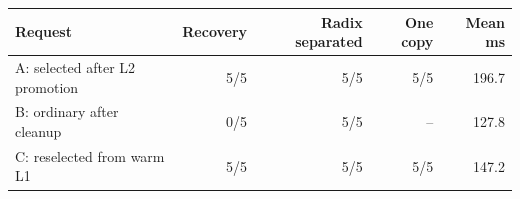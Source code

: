 \begin{tabular}{lrrrr}
\toprule
Request & Recovery & Radix separated & One copy & Mean ms \\
\midrule
A: selected after L2 promotion & 5/5 & 5/5 & 5/5 & 196.7 \\
B: ordinary after cleanup & 0/5 & 5/5 & -- & 127.8 \\
C: reselected from warm L1 & 5/5 & 5/5 & 5/5 & 147.2 \\
\bottomrule
\end{tabular}
